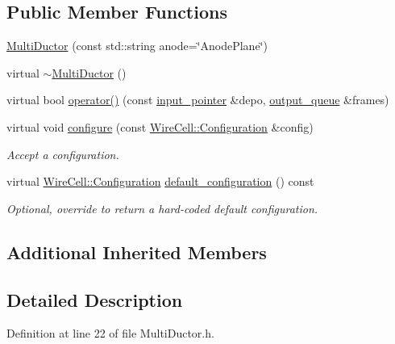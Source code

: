 \subsection*{Public Member Functions}
\begin{DoxyCompactItemize}
\item 
\hyperlink{class_wire_cell_1_1_gen_1_1_multi_ductor_a982d97dfdb0fce2ef5881b863e2dbfb9}{Multi\+Ductor} (const std\+::string anode=\char`\"{}Anode\+Plane\char`\"{})
\item 
virtual \hyperlink{class_wire_cell_1_1_gen_1_1_multi_ductor_a8b06714e9ab139aa2a3bdaa08998a053}{$\sim$\+Multi\+Ductor} ()
\item 
virtual bool \hyperlink{class_wire_cell_1_1_gen_1_1_multi_ductor_ae3b9c4338fd2902bce0a1adb418f7a2e}{operator()} (const \hyperlink{class_wire_cell_1_1_i_queuedout_node_acf5f716a764553f3c7055a9cf67e906e}{input\+\_\+pointer} \&depo, \hyperlink{class_wire_cell_1_1_i_queuedout_node_a39018e4e3dd886befac9636ac791a685}{output\+\_\+queue} \&frames)
\item 
virtual void \hyperlink{class_wire_cell_1_1_gen_1_1_multi_ductor_aecbe93d6293cfc1fe881952ceb15c012}{configure} (const \hyperlink{namespace_wire_cell_a9f705541fc1d46c608b3d32c182333ee}{Wire\+Cell\+::\+Configuration} \&config)
\begin{DoxyCompactList}\small\item\em Accept a configuration. \end{DoxyCompactList}\item 
virtual \hyperlink{namespace_wire_cell_a9f705541fc1d46c608b3d32c182333ee}{Wire\+Cell\+::\+Configuration} \hyperlink{class_wire_cell_1_1_gen_1_1_multi_ductor_a53f3aad2f0b57657421638cb695f8c36}{default\+\_\+configuration} () const
\begin{DoxyCompactList}\small\item\em Optional, override to return a hard-\/coded default configuration. \end{DoxyCompactList}\end{DoxyCompactItemize}
\subsection*{Additional Inherited Members}


\subsection{Detailed Description}


Definition at line 22 of file Multi\+Ductor.\+h.



